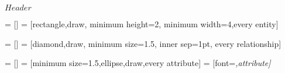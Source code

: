 \ProvidesPackageRCS[v\pgfversion] $Header$

%




=           []
=                 [rectangle,draw,
                                     minimum height=2\baselineskip,
                                     minimum width=4\baselineskip,every entity]



=     []
=           [diamond,draw,
                                     minimum size=1.5\baselineskip,
                                     inner sep=1pt,
                                     every relationship]



=        []
=              [minimum size=1.5\baselineskip,ellipse,draw,every attribute]
=          [font=\itshape,attribute]




\endinput
